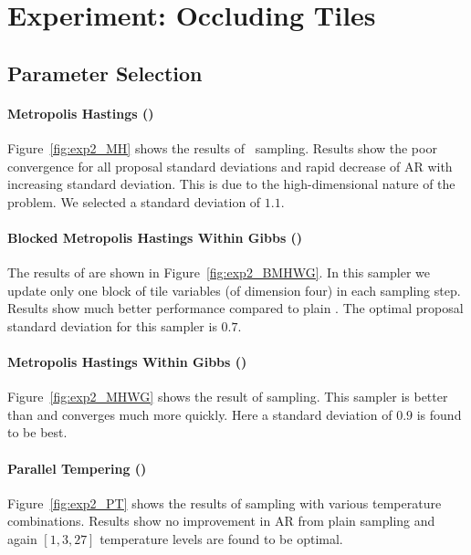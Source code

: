 \section{Experiment: Occluding Tiles}
\label{appendix:chap3:tiles}

\subsection{Parameter Selection}

\paragraph{Metropolis Hastings (\MH)}

Figure~\ref{fig:exp2_MH} shows the results of
\MH~sampling. Results show the poor convergence for all proposal
standard deviations and rapid decrease of AR with increasing standard
deviation. This is due to the high-dimensional nature of
the problem. We selected a standard deviation of $1.1$.

\paragraph{Blocked Metropolis Hastings Within Gibbs (\BMHWG)}

The results of \BMHWG are shown in Figure~\ref{fig:exp2_BMHWG}. In
this sampler we update only one block of tile variables (of dimension
four) in each sampling step. Results show much better performance
compared to plain \MH. The optimal proposal standard deviation for
this sampler is $0.7$.

\paragraph{Metropolis Hastings Within Gibbs (\MHWG)}

Figure~\ref{fig:exp2_MHWG} shows the result of \MHWG sampling. This
sampler is better than \BMHWG and converges much more quickly. Here
a standard deviation of $0.9$ is found to be best.

\paragraph{Parallel Tempering (\PT)}

Figure~\ref{fig:exp2_PT} shows the results of \PT sampling with various
temperature combinations. Results show no improvement in AR from plain
\MH sampling and again $[1,3,27]$ temperature levels are found to be optimal.

